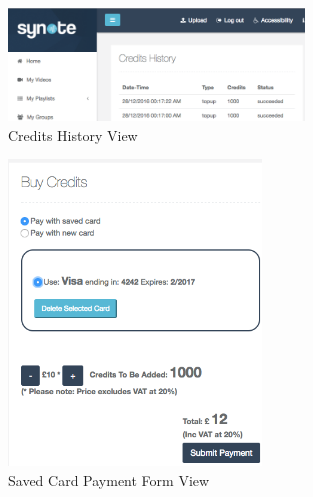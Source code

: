 \begin{figure}[!hbt]
    \centering
  \includegraphics[width=0.7\textwidth]{screenshot-credit-history.png}
    \caption{Credits History View}
  \label{fig:credits-history-screenshot}
\end{figure}

\begin{figure}[!hbt]
    \centering
  \includegraphics[width=0.6\textwidth]{screenshot-saved-card-form.png}
    \caption{Saved Card Payment Form View}
  \label{fig:saved-cards-form-screenshot}
\end{figure}
